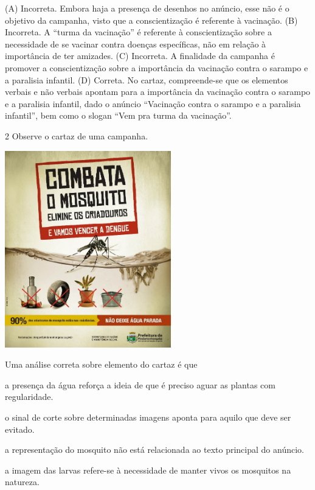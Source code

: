 (A) Incorreta. Embora haja a presença de desenhos no anúncio, esse não é
o objetivo da campanha, visto que a conscientização é referente à
vacinação.
(B) Incorreta. A ``turma da vacinação'' é referente à conscientização
sobre a necessidade de se vacinar contra doenças específicas, não em
relação à importância de ter amizades.
(C) Incorreta. A finalidade da campanha é promover a conscientização sobre a
importância da vacinação contra o sarampo e a paralisia infantil.
(D) Correta. No cartaz, compreende-se que os elementos verbais e não
verbais apontam para a importância da vacinação contra o sarampo e a
paralisia infantil, dado o anúncio ``Vacinação contra o sarampo e a
paralisia infantil'', bem como o slogan ``Vem pra turma da vacinação''.

\num{2} Observe o cartaz de uma campanha.


\includegraphics[width=2.84375in,height=3.36642in]{./media/image13.jpeg}

Uma análise correta sobre elemento do cartaz é que

\begin{escolha}
\item a presença da água reforça a ideia de que é preciso aguar as plantas com regularidade.

\item o sinal de corte sobre determinadas imagens aponta para aquilo que deve ser evitado.

\item a representação do mosquito não está relacionada ao texto principal do anúncio.

\item a imagem das larvas refere-se à necessidade de manter vivos os mosquitos na natureza.
\end{escolha}

